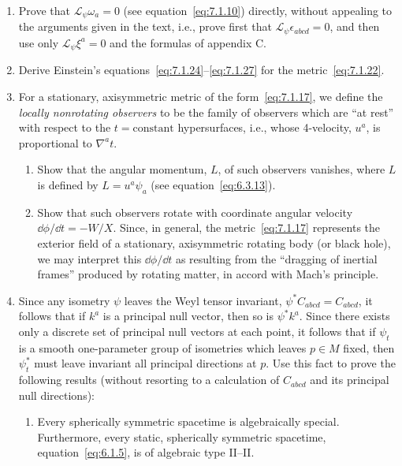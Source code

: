 
\chapterproblems

\begin{enumerate}[label=\arabic*.,leftmargin=*]
\item Prove that \(\mathcal L_\psi\omega_a=0\) (see
equation~\eqref{eq:7.1.10}) directly, without appealing to the arguments given in
the text, i.e., prove first that \(\mathcal L_\psi\epsilon_{abcd}=0\), and then use
only \(\mathcal L_\psi\xi^a=0\) and the formulas of appendix C.

\item Derive Einstein's equations~\eqref{eq:7.1.24}--\eqref{eq:7.1.27} for the
metric~\eqref{eq:7.1.22}.

\item For a stationary, axisymmetric metric of the form~\eqref{eq:7.1.17}, we
define the \emph{locally nonrotating observers} to be the family of observers which
are “at rest” with respect to the \(t=\text{constant}\) hypersurfaces, i.e., whose
4-velocity, \(u^a\), is proportional to \(\nabla^at\).
\begin{enumerate}[label=\alph*),leftmargin=2.5em]
\item Show that the angular momentum, \(L\), of such observers vanishes, where
\(L\) is defined by \(L=u^a\psi_a\) (see equation~\eqref{eq:6.3.13}).

\par\medskip

\item Show that such observers rotate with coordinate angular velocity
\(\dd\phi/\dd t=-W/X\). Since, in general, the metric~\eqref{eq:7.1.17} represents
the exterior field of a stationary, axisymmetric rotating body (or black hole), we
may interpret this \(\dd\phi/\dd t\) as resulting from the “dragging of inertial frames”
produced by rotating matter, in accord with Mach's principle.
\end{enumerate}

\item Since any isometry \(\psi\) leaves the Weyl tensor invariant,
\(\psi^*C_{abcd}=C_{abcd}\), it follows that if \(k^a\) is a principal null
vector, then so is \(\psi^*k^a\). Since there exists only a discrete set of principal
null vectors at each point, it follows that if \(\psi_t\) is a smooth one-parameter
group of isometries which leaves \(p\in M\) fixed, then \(\psi_t^*\) must leave
invariant all principal directions at \(p\). Use this fact to prove the following
results (without resorting to a calculation of \(C_{abcd}\) and its principal null
directions):
\begin{enumerate}[label=\alph*),leftmargin=2.5em]
\item Every spherically symmetric spacetime is algebraically special. Furthermore,
every static, spherically symmetric spacetime, equation~\eqref{eq:6.1.5}, is of
algebraic type II--II.


\end{enumerate}
\end{enumerate}
